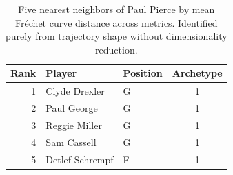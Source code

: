 \begin{table}[htbp]
  \centering\small
  \begin{tabular}{rllc}
    \toprule
    Rank & Player & Position & Archetype \\
    \midrule
    1 & Clyde Drexler & G & 1 \\
    2 & Paul George & G & 1 \\
    3 & Reggie Miller & G & 1 \\
    4 & Sam Cassell & G & 1 \\
    5 & Detlef Schrempf & F & 1 \\
    \bottomrule
  \end{tabular}
  \caption{Five nearest neighbors of Paul Pierce by mean Fr\'{e}chet curve distance across metrics. Identified purely from trajectory shape without dimensionality reduction.}
  \label{tab:Paul_Pierce_frechet_curve_neighbors}
\end{table}

